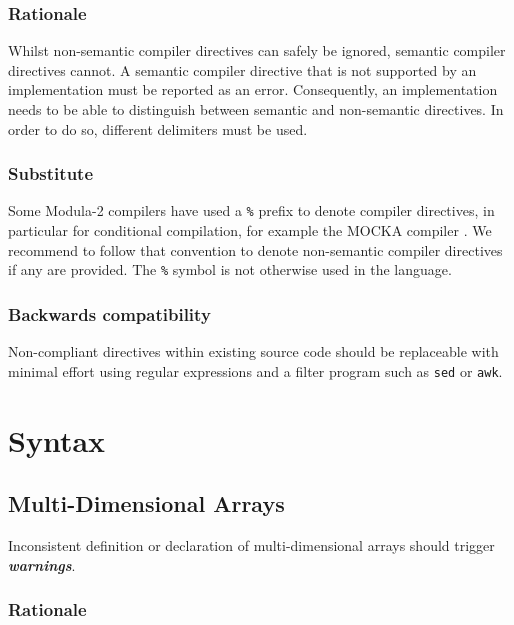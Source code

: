 \documentclass[10pt,a4paper]{article}
\renewcommand{\emph}[1]{\textbf{\textit{#1}}}
\begin{document}
\subsubsection{Rationale}

Whilst \glspl{non-semantic compiler directive} can safely be ignored,
\glspl{semantic compiler directive} cannot. A \gls{semantic compiler directive}
that is not supported by an implementation must be reported as an error.
Consequently, an implementation needs to be able to distinguish between
semantic and non-semantic directives. In order to do so, different delimiters
must be used.

\subsubsection{Substitute}

Some Modula-2 compilers have used a \verb|%|
prefix to denote \glspl{compiler directive}, in particular for conditional
compilation, for example the  MOCKA compiler \cite{MOCKA}. We recommend to
follow that convention to denote \glspl{non-semantic compiler directive}
if any are provided. The \verb|%|
symbol is not otherwise used in the language.

\subsubsection{Backwards compatibility}

Non-compliant directives within existing source code should be replaceable with
minimal effort using regular expressions and a filter program such as
\verb|sed| or \verb|awk|. 


\section{Syntax}

\subsection{Multi-Dimensional Arrays}

Inconsistent definition or declaration of multi-dimensional arrays should
trigger \emph{warnings}.

\subsubsection{Rationale}
\end{document}
